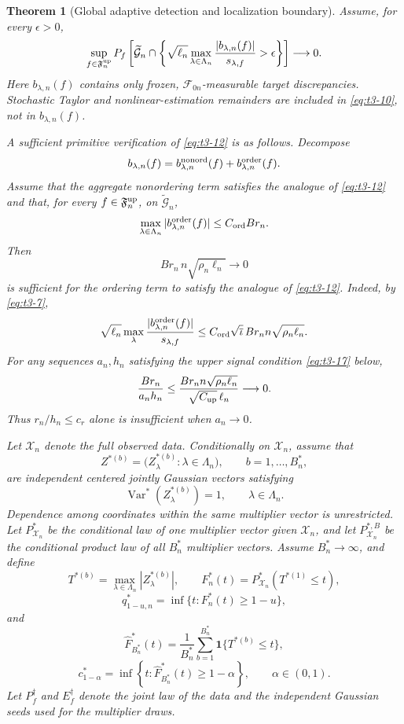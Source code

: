\documentclass[11pt]{article}
\newtheorem{theorem}{Theorem}[section]
\theoremstyle{definition}
\newcommand{\1}{\mathbf 1}\newcommand{\op}{\operatorname}
\begin{document}
\begin{theorem}[Global adaptive detection and localization boundary]
Assume, for every \(\epsilon>0\),
\begin{equation}
\sup_{f\in\mathfrak F_n^{\rm up}}
P_f\left[
\widetilde{\mathcal G}_n
\cap
\left\{
\sqrt{\ell_n}
\max_{\lambda\in\Lambda_n}
\frac{|b_{\lambda,n}(f)|}{s_{\lambda,f}}
>\epsilon
\right\}
\right]
\longrightarrow0.
\label{eq:t3-12}
\end{equation}
Here \(b_{\lambda,n}(f)\) contains only frozen,
\(\mathcal F_{0n}\)-measurable target discrepancies.  Stochastic
Taylor and nonlinear-estimation remainders are included in
\eqref{eq:t3-10}, not in \(b_{\lambda,n}(f)\).

A sufficient primitive verification of \eqref{eq:t3-12} is as
follows.  Decompose
\[
b_{\lambda,n}(f)
=
b_{\lambda,n}^{\rm nonord}(f)
+
b_{\lambda,n}^{\rm order}(f).
\]
Assume that the aggregate nonordering term satisfies the analogue of
\eqref{eq:t3-12} and that, for every
\(f\in\mathfrak F_n^{\rm up}\), on
\(\widetilde{\mathcal G}_n\),
\[
\max_{\lambda\in\Lambda_n}
|b_{\lambda,n}^{\rm order}(f)|
\le
C_{\rm ord}Br_n.
\]
Then
\begin{equation}
Br_n\,n\sqrt{\rho_n\ell_n}
\longrightarrow0
\label{eq:t3-13}
\end{equation}
is sufficient for the ordering term to satisfy the analogue of
\eqref{eq:t3-12}.  Indeed, by \eqref{eq:t3-7},
\[
\sqrt{\ell_n}
\max_\lambda
\frac{|b_{\lambda,n}^{\rm order}(f)|}{s_{\lambda,f}}
\le
C_{\rm ord}\sqrt{\overline\iota}\,
Br_n n\sqrt{\rho_n\ell_n}.
\]
For any sequences \(a_n,h_n\) satisfying the upper signal condition
\eqref{eq:t3-17} below,
\[
\frac{Br_n}{a_n h_n}
\le
\frac{
Br_n n\sqrt{\rho_n\ell_n}
}{
\sqrt{C_{\rm up}}\,\ell_n
}
\longrightarrow0.
\]
Thus \(r_n/h_n\le c_r\) alone is insufficient when \(a_n\to0\).

Let \(\mathcal X_n\) denote the full observed data.  Conditionally on
\(\mathcal X_n\), assume that
\[
Z^{*(b)}
=
\bigl(
Z_\lambda^{*(b)}:
\lambda\in\Lambda_n
\bigr),
\qquad b=1,\ldots,B_n^*,
\]
are independent centered jointly Gaussian vectors satisfying
\begin{equation}
\operatorname{Var}^*(Z_\lambda^{*(b)})=1,
\qquad
\lambda\in\Lambda_n.
\label{eq:t3-14}
\end{equation}
Dependence among coordinates within the same multiplier vector is
unrestricted.  Let \(P_{\mathcal X_n}^*\) be the conditional law of
one multiplier vector given \(\mathcal X_n\), and let
\(P_{\mathcal X_n}^{*,B}\) be the conditional product law of all
\(B_n^*\) multiplier vectors.  Assume \(B_n^*\to\infty\), and define
\[
T^{*(b)}
=
\max_{\lambda\in\Lambda_n}|Z_\lambda^{*(b)}|,
\qquad
F_n^*(t)
=
P_{\mathcal X_n}^*(T^{*(1)}\le t),
\]
\[
q_{1-u,n}^*
=
\inf\{t:F_n^*(t)\ge1-u\},
\]
and
\[
\widehat F_{B_n^*}^*(t)
=
\frac1{B_n^*}
\sum_{b=1}^{B_n^*}
\mathbf 1\{T^{*(b)}\le t\},
\]
\[
c_{1-\alpha}^*
=
\inf\left\{
t:
\widehat F_{B_n^*}^*(t)\ge1-\alpha
\right\},
\qquad
\alpha\in(0,1).
\]
Let \(P_f^\dagger\) and \(E_f^\dagger\) denote the joint law of the
data and the independent Gaussian seeds used for the multiplier
draws.


\end{theorem}
\end{document}
